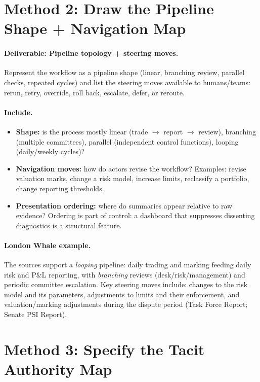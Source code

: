 \section{Method 2: Draw the Pipeline Shape + Navigation Map}
\label{sec:m2-shape}

\paragraph{Deliverable: Pipeline topology + steering moves.}
Represent the workflow as a pipeline shape (linear, branching review, parallel checks, repeated cycles) and list the steering moves
available to humans/teams: rerun, retry, override, roll back, escalate, defer, or reroute.

\paragraph{Include.}
\begin{itemize}
  \item \textbf{Shape:} is the process mostly linear (trade $\rightarrow$ report $\rightarrow$ review),
        branching (multiple committees), parallel (independent control functions), looping (daily/weekly cycles)?
  \item \textbf{Navigation moves:} how do actors revise the workflow?
        Examples: revise valuation marks, change a risk model, increase limits, reclassify a portfolio, change reporting thresholds.
  \item \textbf{Presentation ordering:} where do summaries appear relative to raw evidence?
        Ordering is part of control: a dashboard that suppresses dissenting diagnostics is a structural feature.
\end{itemize}

\paragraph{London Whale example.}
The sources support a \emph{looping} pipeline: daily trading and marking feeding daily risk and P\&L reporting,
with \emph{branching} reviews (desk/risk/management) and periodic committee escalation.
Key steering moves include: changes to the risk model and its parameters, adjustments to limits and their enforcement,
and valuation/marking adjustments during the dispute period (Task Force Report; Senate PSI Report).

\section{Method 3: Specify the Tacit Authority Map}
\label{sec:m3-authority}

